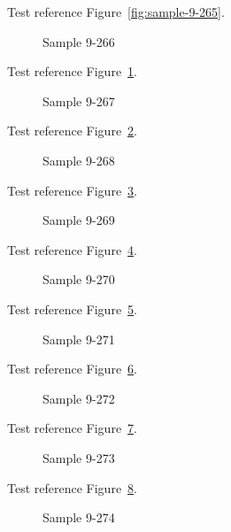 Test reference Figure~\ref{fig:sample-9-265}.

\begin{figure}[tbhp]
\caption{Sample 9-266}
\label{fig:sample-9-266}
\end{figure}

Test reference Figure~\ref{fig:sample-9-266}.

\begin{figure}[tbhp]
\caption{Sample 9-267}
\label{fig:sample-9-267}
\end{figure}

Test reference Figure~\ref{fig:sample-9-267}.

\begin{figure}[tbhp]
\caption{Sample 9-268}
\label{fig:sample-9-268}
\end{figure}

Test reference Figure~\ref{fig:sample-9-268}.

\begin{figure}[tbhp]
\caption{Sample 9-269}
\label{fig:sample-9-269}
\end{figure}

Test reference Figure~\ref{fig:sample-9-269}.

\begin{figure}[tbhp]
\caption{Sample 9-270}
\label{fig:sample-9-270}
\end{figure}

Test reference Figure~\ref{fig:sample-9-270}.

\begin{figure}[tbhp]
\caption{Sample 9-271}
\label{fig:sample-9-271}
\end{figure}

Test reference Figure~\ref{fig:sample-9-271}.

\begin{figure}[tbhp]
\caption{Sample 9-272}
\label{fig:sample-9-272}
\end{figure}

Test reference Figure~\ref{fig:sample-9-272}.

\begin{figure}[tbhp]
\caption{Sample 9-273}
\label{fig:sample-9-273}
\end{figure}

Test reference Figure~\ref{fig:sample-9-273}.

\begin{figure}[tbhp]
\caption{Sample 9-274}
\label{fig:sample-9-274}
\end{figure}

